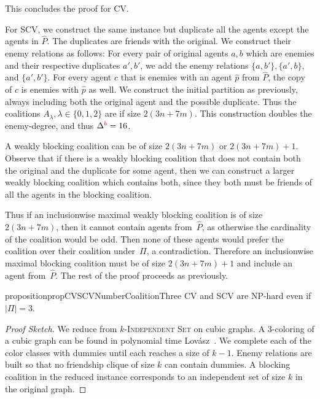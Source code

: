 \documentclass[a4paper,fleqn]{cas-sc}
\newcommand{\enemyColor}{red}
\newcommand{\partition}{\ensuremath{\Pi}\xspace}
\newcommand{\enemySuperscript}{{\color{\enemyColor}b}}
\newcommand{\coalA}{\ensuremath{A}}
\newcommand{\probname}[1]{\textsc{#1}}
\newcommand{\kIS}[1]{\probname{#1-Independent Set}\xspace}
\newcommand{\SCV}{SCV\xspace}
\newcommand{\CV}{CV\xspace}
\newcommand{\maxDegree}{\ensuremath{\Delta}}
\newcommand{\maxDegreeEnemy}{\ensuremath{\maxDegree^{\enemySuperscript}}\xspace}
\newcommand{\maxNumberOfCoalitions}{\ensuremath{|\partition|}\xspace}
\newcommand{\ri}{\ensuremath{{\lambda}}}
\newcommand{\mainpicks}{\ensuremath{\hat{P}}}
\newcommand{\appsymb}{$\star$}
\begin{document}
{This concludes the proof for \CV.


For \SCV, we construct the same instance but duplicate all the agents except the agents in \mainpicks.
The duplicates are friends with the original.
We construct their enemy relations as follows: For every pair of original agents $a, b$ which are enemies and their respective duplicates $a', b'$, we add the enemy relations $\{a, b'\}, \{a', b\}$, and $\{a',b'\}$. For every agent $c$  that is enemies with an agent $\hat{p}$ from \mainpicks, the copy of $c$ is enemies with $\hat{p}$ as well.
We construct the initial partition as previously, always including both the original agent and the possible duplicate.
Thus the coalitions $\coalA_\ri, \ri \in \{0,1,2\}$ are if size $2(3n + 7m)$.
This construction doubles the enemy-degree, and thus $\maxDegreeEnemy = 16$.

A weakly blocking coalition can be of size $2(3n + 7m)$ or $2(3n + 7m) + 1$.
Observe that if there is a weakly blocking coalition that does not contain both the original and the duplicate for some agent, then we can construct a larger weakly blocking coalition which contains both, since they both must be friends of all the agents in the blocking coalition.

Thus if an inclusionwise maximal weakly blocking coalition is of size $2(3n + 7m)$, then it cannot contain agents from~\mainpicks, as otherwise the cardinality of the coalition would be odd. Then none of these agents would prefer the coalition over their coalition under~\partition, a contradiction.
Therefore an inclusionwise maximal blocking coalition must be of size $2(3n + 7m) + 1$ and include an agent from~\mainpicks.
The rest of the proof proceeds as previously.

}




\begin{restatable}[\appsymb]{proposition}{propCVSCVNumberCoalitionThree}
    \CV and \SCV  are NP-hard even if $\maxNumberOfCoalitions=3$.
    \label{prop:CV_SCV_Number_Coalitions_3+}
\end{restatable}

\begin{proof}[Proof Sketch]
We reduce from \kIS{$k$} on cubic graphs. A 3-coloring of a cubic graph can be found in polynomial time Lov{\'a}sz~\cite{lovasz1975three}. We complete each of the color classes with dummies until each reaches a size of $k-1$. Enemy relations are built so that no friendship clique of size $k$ can contain dummies. A blocking coalition in the reduced instance corresponds to an independent set of size $k$ in the original graph.
\end{proof}
\end{document}
